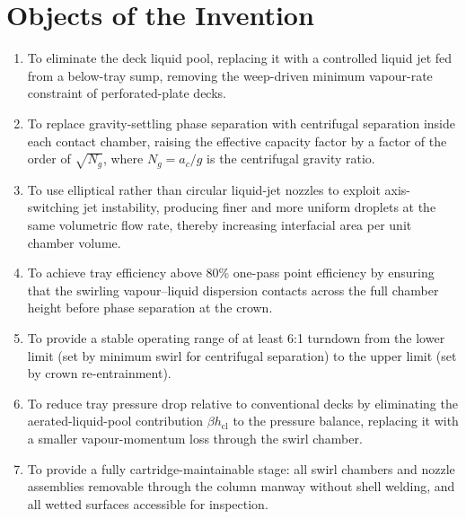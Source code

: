 \documentclass[11pt,letterpaper]{article}
\begin{document}
\section{Objects of the Invention}

\begin{enumerate}[nosep]
  \item To eliminate the deck liquid pool, replacing it with a controlled
    liquid jet fed from a below-tray sump, removing the weep-driven minimum
    vapour-rate constraint of perforated-plate decks.

  \item To replace gravity-settling phase separation with centrifugal
    separation inside each contact chamber, raising the effective capacity
    factor by a factor of the order of $\sqrt{N_g}$, where $N_g = a_c/g$
    is the centrifugal gravity ratio.

  \item To use elliptical rather than circular liquid-jet nozzles to exploit
    axis-switching jet instability, producing finer and more uniform droplets
    at the same volumetric flow rate, thereby increasing interfacial area per
    unit chamber volume.

  \item To achieve tray efficiency above 80\% one-pass point efficiency by
    ensuring that the swirling vapour--liquid dispersion contacts across the
    full chamber height before phase separation at the crown.

  \item To provide a stable operating range of at least 6:1 turndown from
    the lower limit (set by minimum swirl for centrifugal separation) to the
    upper limit (set by crown re-entrainment).

  \item To reduce tray pressure drop relative to conventional decks by
    eliminating the aerated-liquid-pool contribution $\beta h_{\mathrm{cl}}$
    to the pressure balance, replacing it with a smaller vapour-momentum
    loss through the swirl chamber.

  \item To provide a fully cartridge-maintainable stage: all swirl chambers
    and nozzle assemblies removable through the column manway without shell
    welding, and all wetted surfaces accessible for inspection.
\end{enumerate}
\end{document}
